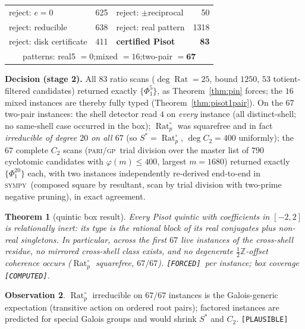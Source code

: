 \documentclass[11pt]{article}
\newcommand{\F}{\textnormal{\texttt{[FORCED]}}}
\newcommand{\C}{\textnormal{\texttt{[COMPUTED]}}}
\newcommand{\Pl}{\textnormal{\texttt{[PLAUSIBLE]}}}
\newcommand{\Z}{\mathbb{Z}}
\newcommand{\Rat}{\operatorname{Rat}}
\newcommand{\gp}{\textsc{pari/gp}}
\newcommand{\sy}{\textsc{sympy}}
\newtheorem{theorem}{Theorem}[section]
\theoremstyle{definition}
\newtheorem{observation}[theorem]{Observation}
\begin{document}
\begin{center}
\begin{tabular}{lrlr}
\hline
reject: $e=0$ & 625 & reject: $\pm$reciprocal & 50\\
reject: reducible & 638 & reject: real pattern & 1318\\
reject: disk certificate & 411 & \textbf{certified Pisot} & \textbf{83}\\
\hline
\multicolumn{4}{c}{patterns: real5 $=0$;\quad mixed $=16$;\quad two-pair $=\mathbf{67}$}\\
\hline
\end{tabular}
\end{center}

\textbf{Decision (stage 2).} All $83$ ratio scans ($\deg\Rat=25$, bound $1250$,
$53$ totient-filtered candidates) returned exactly $\{\Phi_1^5\}$, as
Theorem~\ref{thm:pin} forces; the $16$ mixed instances are thereby fully typed
(Theorem~\ref{thm:pisot1pair}). On the $67$ two-pair instances: the shell
detector read $4$ on \emph{every} instance (all distinct-shell; no same-shell
case occurred in the box); $\Rat_p^{\circ}$ was squarefree and in fact
\emph{irreducible of degree $20$ on all $67$} (so $S^{*}=\Rat_p^{\circ}$,
$\deg C_2=400$ uniformly); the $67$ complete $C_2$ scans (\gp\ trial division
over the master list of $790$ cyclotomic candidates with
$\varphi(m)\le400$, largest $m=1680$) returned exactly $\{\Phi_1^{20}\}$ each,
with two instances independently re-derived end-to-end in \sy\ (composed square
by resultant, scan by trial division with two-prime negative pruning), in exact
agreement.

\begin{theorem}[quintic box result]\label{thm:box}
Every Pisot quintic with coefficients in $[-2,2]$ is relationally inert: its
type is the rational block of its real conjugates plus non-real singletons. In
particular, across the first $67$ live instances of the cross-shell residue,
\emph{no mirrored cross-shell class exists}, and no degenerate
$\tfrac12\Z$-offset coherence occurs ($\Rat_p^{\circ}$ squarefree, $67/67$).
\F\ per instance; box coverage \C.
\end{theorem}

\begin{observation}\label{obs:generic}
$\Rat_p^{\circ}$ irreducible on $67/67$ instances is the Galois-generic
expectation (transitive action on ordered root pairs); factored instances are
predicted for special Galois groups and would shrink $S^{*}$ and $C_2$. \Pl
\end{observation}
\end{document}
